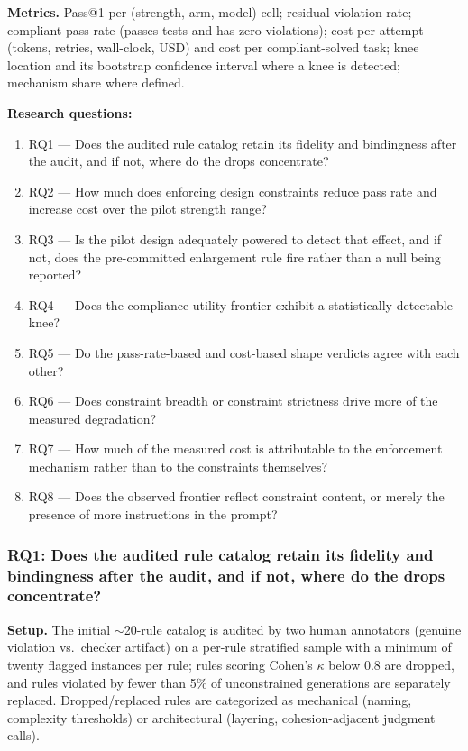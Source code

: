 \documentclass[11pt]{article}
\begin{document}
\textbf{Metrics.} Pass@1 per (strength, arm, model) cell; residual violation rate; compliant-pass rate (passes tests and has zero violations); cost per attempt (tokens, retries, wall-clock, USD) and cost per compliant-solved task; knee location and its bootstrap confidence interval where a knee is detected; mechanism share where defined.

\textbf{Research questions:}
\begin{enumerate}[leftmargin=1.6em]
\item RQ1 --- Does the audited rule catalog retain its fidelity and bindingness after the audit, and if not, where do the drops concentrate?
\item RQ2 --- How much does enforcing design constraints reduce pass rate and increase cost over the pilot strength range?
\item RQ3 --- Is the pilot design adequately powered to detect that effect, and if not, does the pre-committed enlargement rule fire rather than a null being reported?
\item RQ4 --- Does the compliance-utility frontier exhibit a statistically detectable knee?
\item RQ5 --- Do the pass-rate-based and cost-based shape verdicts agree with each other?
\item RQ6 --- Does constraint breadth or constraint strictness drive more of the measured degradation?
\item RQ7 --- How much of the measured cost is attributable to the enforcement mechanism rather than to the constraints themselves?
\item RQ8 --- Does the observed frontier reflect constraint content, or merely the presence of more instructions in the prompt?
\end{enumerate}

\subsubsection{RQ1: Does the audited rule catalog retain its fidelity and bindingness after the audit, and if not, where do the drops concentrate?}
\textbf{Setup.} The initial $\sim$20-rule catalog is audited by two human annotators (genuine violation vs.\ checker artifact) on a per-rule stratified sample with a minimum of twenty flagged instances per rule; rules scoring Cohen's $\kappa$ below 0.8 are dropped, and rules violated by fewer than 5\% of unconstrained generations are separately replaced. Dropped/replaced rules are categorized as mechanical (naming, complexity thresholds) or architectural (layering, cohesion-adjacent judgment calls).
\end{document}
